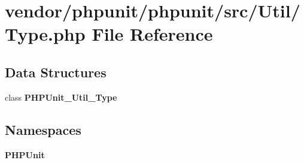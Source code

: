 \section{vendor/phpunit/phpunit/src/\+Util/\+Type.php File Reference}
\label{_type_8php}
\subsection*{Data Structures}
\begin{DoxyCompactItemize}
\item 
class {\bf P\+H\+P\+Unit\+\_\+\+Util\+\_\+\+Type}
\end{DoxyCompactItemize}
\subsection*{Namespaces}
\begin{DoxyCompactItemize}
\item 
 {\bf P\+H\+P\+Unit}
\end{DoxyCompactItemize}
